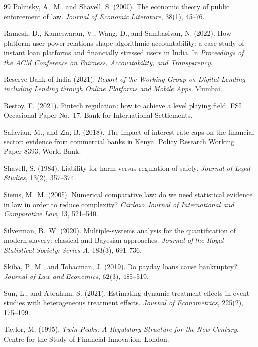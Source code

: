 \documentclass[11pt]{article}
\theoremstyle{plain}
\theoremstyle{definition}
\theoremstyle{remark}
\begin{document}
\begin{thebibliography}{99}
Polinsky, A.~M., and Shavell, S. (2000). The economic theory of public enforcement of law. \emph{Journal of Economic Literature}, 38(1), 45--76.

Ramesh, D., Kameswaran, V., Wang, D., and Sambasivan, N. (2022). How platform-user power relations shape algorithmic accountability: a case study of instant loan platforms and financially stressed users in India. In \emph{Proceedings of the ACM Conference on Fairness, Accountability, and Transparency}.

Reserve Bank of India (2021). \emph{Report of the Working Group on Digital Lending including Lending through Online Platforms and Mobile Apps}. Mumbai.

Restoy, F. (2021). Fintech regulation: how to achieve a level playing field. FSI Occasional Paper No.~17, Bank for International Settlements.

Safavian, M., and Zia, B. (2018). The impact of interest rate caps on the financial sector: evidence from commercial banks in Kenya. Policy Research Working Paper 8393, World Bank.

Shavell, S. (1984). Liability for harm versus regulation of safety. \emph{Journal of Legal Studies}, 13(2), 357--374.

Siems, M.~M. (2005). Numerical comparative law: do we need statistical evidence in law in order to reduce complexity? \emph{Cardozo Journal of International and Comparative Law}, 13, 521--540.

Silverman, B.~W. (2020). Multiple-systems analysis for the quantification of modern slavery: classical and Bayesian approaches. \emph{Journal of the Royal Statistical Society: Series A}, 183(3), 691--736.

Skiba, P.~M., and Tobacman, J. (2019). Do payday loans cause bankruptcy? \emph{Journal of Law and Economics}, 62(3), 485--519.

Sun, L., and Abraham, S. (2021). Estimating dynamic treatment effects in event studies with heterogeneous treatment effects. \emph{Journal of Econometrics}, 225(2), 175--199.

Taylor, M. (1995). \emph{Twin Peaks: A Regulatory Structure for the New Century}. Centre for the Study of Financial Innovation, London.


\end{thebibliography}
\end{document}
